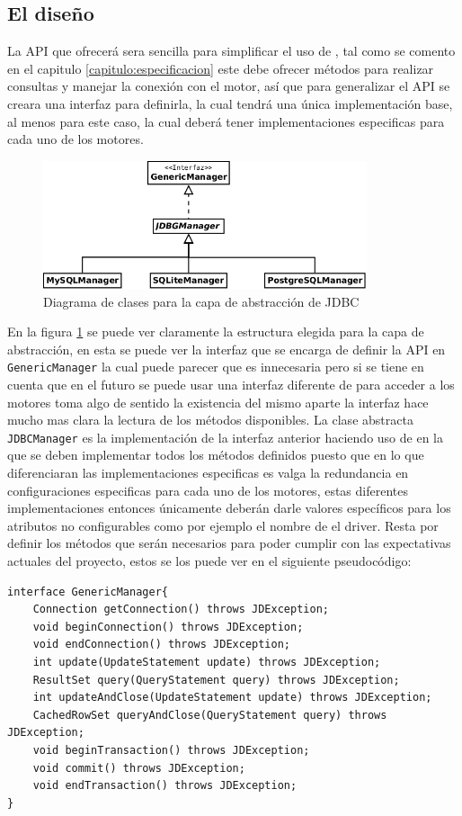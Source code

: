 \subsection{El diseño}
La API que ofrecerá \jj sera sencilla para simplificar el uso de \jd, tal  como se comento en el capitulo \ref{capitulo:especificacion} este debe ofrecer métodos para realizar consultas y manejar la conexión con el motor, así que para generalizar el API se creara una interfaz para definirla, la cual tendrá una única implementación base, al menos para este caso, la cual deberá tener implementaciones especificas para cada uno de los motores.
%
\begin{figure}[h]
  \centering
    \includegraphics[width=0.85\textwidth]{figuras/jdbgm-jdbc.png}
  \caption{Diagrama de clases para la capa de abstracción de JDBC}
  \label{fig:jdbgm-jdbc}
\end{figure}

En la figura \ref{fig:jdbgm-jdbc} se puede ver claramente la estructura elegida para la capa de abstracción, en esta se puede ver la interfaz que se encarga de definir la API en \verb=GenericManager= la cual puede parecer que es innecesaria pero si se tiene en cuenta que en el futuro se puede usar una interfaz diferente de \jd para acceder a los motores toma algo de sentido la existencia del mismo aparte la interfaz hace mucho mas clara la lectura de los métodos disponibles. La clase abstracta \verb=JDBCManager= es la implementación de la interfaz anterior haciendo uso de \jd en la que se deben implementar todos los métodos definidos puesto que en lo que diferenciaran las implementaciones especificas es valga la redundancia en configuraciones especificas para cada uno de los motores, estas diferentes implementaciones entonces únicamente deberán darle valores específicos para los atributos no configurables como por ejemplo el nombre de el driver. Resta por definir los métodos que serán necesarios para poder cumplir con las expectativas actuales del proyecto, estos se los puede ver en el siguiente pseudocódigo:
%
\begin{lstlisting}[title=interfaz GenericManager]
interface GenericManager{
	Connection getConnection() throws JDException;
	void beginConnection() throws JDException;
	void endConnection() throws JDException;
	int update(UpdateStatement update) throws JDException;
	ResultSet query(QueryStatement query) throws JDException;
	int updateAndClose(UpdateStatement update) throws JDException;
	CachedRowSet queryAndClose(QueryStatement query) throws JDException;
	void beginTransaction() throws JDException;
	void commit() throws JDException;
	void endTransaction() throws JDException;
}
\end{lstlisting}
%

